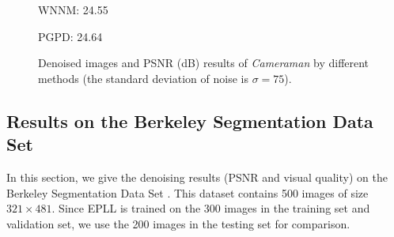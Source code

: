\begin{figure}[ht!]
{\begin{minipage}[t]{0.24\textwidth}
{\footnotesize WNNM: 24.55}
\end{minipage}
\begin{minipage}[t]{0.24\textwidth}
\centering
{}
{\footnotesize PGPD: 24.64}
\end{minipage}
}\vspace{-3mm}
    \caption{Denoised images and PSNR (dB) results of \textsl{Cameraman} by different methods (the standard deviation of noise is $\sigma=75$).}
    \label{fig2-13}
\end{figure}

\subsection{Results on the Berkeley Segmentation Data Set}
In this section, we give the denoising results (PSNR and visual quality) on the Berkeley Segmentation Data Set \cite{bsds}. This dataset contains 500 images of size $321\times481$. Since EPLL is trained on the 300 images in the training set and validation set, we use the 200 images in the testing set for comparison. 

